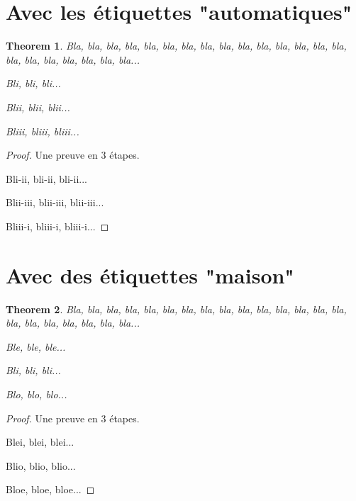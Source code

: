 \documentclass[varwidth, border = 3pt]{standalone}
\newtheorem{theorem}{Theorem}
\begin{document}
\section*{Avec les étiquettes "automatiques"}

\begin{theorem}
  Bla, bla, bla, bla, bla, bla, bla, bla, bla, bla, bla,
  bla, bla, bla, bla, bla, bla, bla, bla, bla, bla, bla...

  \begin{equivcond}
    \item Bli, bli, bli...

    \item Blii, blii, blii...

    \item Bliii, bliii, bliii...
  \end{equivcond}
\end{theorem}

\begin{proof}
  Une preuve en 3 étapes.

  Bli-ii, bli-ii, bli-ii...

  Blii-iii, blii-iii, blii-iii...

  Bliii-i, bliii-i, bliii-i...
\end{proof}


\section*{Avec des étiquettes "maison"}

\begin{theorem}
  Bla, bla, bla, bla, bla, bla, bla, bla, bla, bla, bla,
  bla, bla, bla, bla, bla, bla, bla, bla, bla, bla, bla...

  \begin{equivcond}
    \item \label{e} Ble, ble, ble...

    \item \label{i} Bli, bli, bli...

    \item \label{o} Blo, blo, blo...
  \end{equivcond}
\end{theorem}

\begin{proof}
  Une preuve en 3 étapes.

  Blei, blei, blei...

  Blio, blio, blio...

  Bloe, bloe, bloe...
\end{proof}
\end{document}
